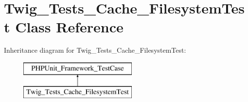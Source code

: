 \hypertarget{classTwig__Tests__Cache__FilesystemTest}{}\section{Twig\+\_\+\+Tests\+\_\+\+Cache\+\_\+\+Filesystem\+Test Class Reference}
\label{classTwig__Tests__Cache__FilesystemTest}
Inheritance diagram for Twig\+\_\+\+Tests\+\_\+\+Cache\+\_\+\+Filesystem\+Test\+:\begin{figure}[H]
\begin{center}
\leavevmode
\includegraphics[height=2.000000cm]{classTwig__Tests__Cache__FilesystemTest}
\end{center}
\end{figure}

